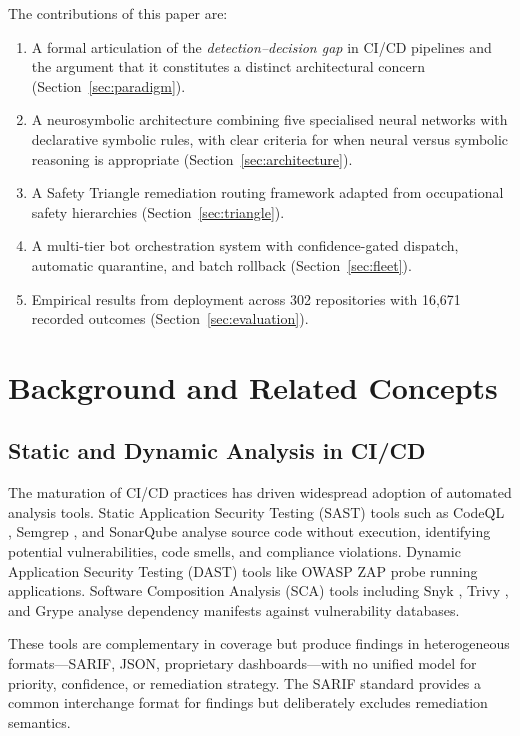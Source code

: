 \documentclass[11pt,a4paper]{article}
\begin{document}
The contributions of this paper are:
\begin{enumerate}[nosep]
  \item A formal articulation of the \emph{detection--decision gap} in CI/CD pipelines and the argument that it constitutes a distinct architectural concern (Section~\ref{sec:paradigm}).
  \item A neurosymbolic architecture combining five specialised neural networks with declarative symbolic rules, with clear criteria for when neural versus symbolic reasoning is appropriate (Section~\ref{sec:architecture}).
  \item A Safety Triangle remediation routing framework adapted from occupational safety hierarchies (Section~\ref{sec:triangle}).
  \item A multi-tier bot orchestration system with confidence-gated dispatch, automatic quarantine, and batch rollback (Section~\ref{sec:fleet}).
  \item Empirical results from deployment across 302 repositories with 16{,}671 recorded outcomes (Section~\ref{sec:evaluation}).
\end{enumerate}


\section{Background and Related Concepts}
\label{sec:background}

\subsection{Static and Dynamic Analysis in CI/CD}

The maturation of CI/CD practices has driven widespread adoption of automated analysis tools. Static Application Security Testing (SAST) tools such as CodeQL \citep{codeql2019}, Semgrep \citep{semgrep2020}, and SonarQube \citep{sonarqube2006} analyse source code without execution, identifying potential vulnerabilities, code smells, and compliance violations. Dynamic Application Security Testing (DAST) tools like OWASP ZAP probe running applications. Software Composition Analysis (SCA) tools including Snyk \citep{snyk2015}, Trivy \citep{trivy2019}, and Grype analyse dependency manifests against vulnerability databases.

These tools are complementary in coverage but produce findings in heterogeneous formats---SARIF, JSON, proprietary dashboards---with no unified model for priority, confidence, or remediation strategy. The SARIF standard \citep{sarif2018} provides a common interchange format for findings but deliberately excludes remediation semantics.
\end{document}
